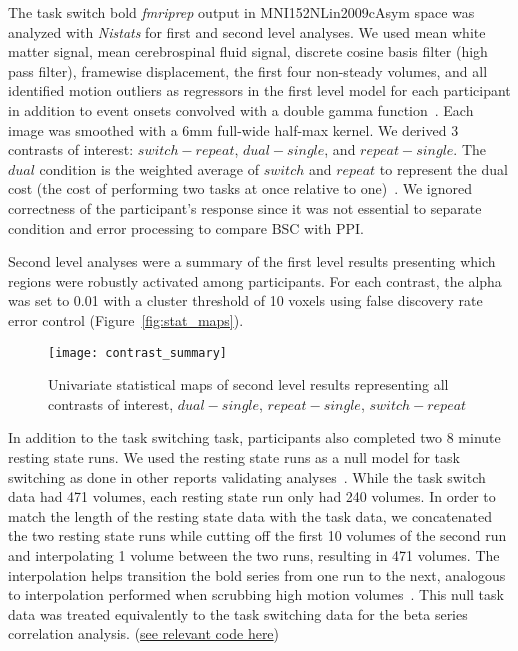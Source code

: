 \documentclass[phd,figures,tables,ackpage,abstractpage,publicabstractpage]{uithesis}
\begin{document}
The task switch bold \emph{fmriprep} output in MNI152NLin2009cAsym space
was analyzed with \emph{Nistats} for first and second level analyses.
We used mean white matter signal, mean cerebrospinal fluid signal,
discrete cosine basis filter (high pass filter), framewise displacement, the first four non-steady volumes, and
all identified motion outliers as regressors in the first level model for each participant
in addition to event onsets convolved with a double gamma function~\cite{Glover1999}.
Each image was smoothed with a 6mm full-wide half-max kernel.
We derived 3 contrasts of interest: $switch - repeat$, $dual- single$, and $repeat - single$.
The $dual$ condition is the weighted average of $switch$ and $repeat$ to represent the
dual cost (the cost of performing two tasks at once relative to one)~\cite{Wylie2000,Verhaeghen2003}.
We ignored correctness of the participant's response since it was not essential to
separate condition and error processing to compare BSC with PPI.

Second level analyses were a summary of the first level results presenting which
regions were robustly activated among participants.
For each contrast, the alpha was set to 0.01 with a cluster threshold of 10 voxels using
false discovery rate error control (Figure~\ref{fig:stat_maps}).

\begin{figure}[H]
  \centering
  \texttt{[image: contrast\_summary]}
  \caption[Univariate statistical maps]{
    Univariate statistical maps of second level results representing
    all contrasts of interest, $dual - single$, $repeat - single$, $switch - repeat$}
  \label{fig:stat_maps2}
\end{figure}

In addition to the task switching task, participants also completed
two 8 minute resting state runs.
We used the resting state runs as a null model for task switching as done
in other reports validating analyses~\cite{Eklund2016,Olszowy2019}.
While the task switch data had 471 volumes, each resting state run only had
240 volumes.
In order to match the length of the resting state data with the task data, we concatenated
the two resting state runs while cutting off the first 10 volumes of the second run
and interpolating 1 volume between the two runs, resulting in 471 volumes.
The interpolation helps transition the bold series from one run to the next,
analogous to interpolation performed when scrubbing high motion volumes~\cite{Power2014a}. 
This null task data was treated equivalently to the task switching data for the
beta series correlation analysis.
(\href{https://github.com/jdkent/validateBetaSeries/tree/195ad5b4201971038dbbf8f73a3c537caf032743}{see relevant code here})
\end{document}
